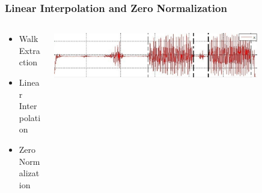 \documentclass{beamer}
\begin{document}
\begin{frame}
  \frametitle{Linear Interpolation and Zero Normalization}

  \begin{columns}
  \begin{column}{0.4\textwidth}
  \begin{itemize}
    \item Walk Extraction 
  	\linebreak
  	\item Linear Interpolation
  	\linebreak
	\item Zero Normalization 
  \end{itemize}
  \end{column}
  \begin{column}{0.8\textwidth}
   \includegraphics[width=0.8\textwidth]{Illustrations/onegaitcycle.png}
       \\
  \end{column}
  \end{columns}
\end{frame}
\end{document}

